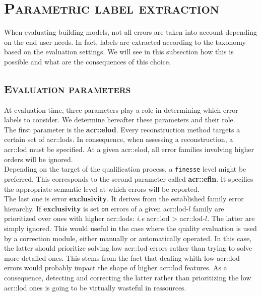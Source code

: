 \section{\textsc{Parametric label extraction}}
    \label{sec::semantic_evaluation::label_extraction}
    When evaluating building models, not all errors are taken into account depending on the end user needs.
    In fact, labels are extracted according to the taxonomy based on the evaluation settings.
    We will see in this subsection how this is possible and what are the consequences of this choice.

    \subsection{\textsc{Evaluation parameters}}
        At evaluation time, three parameters play a role in determining which error labels to consider.
        We determine hereafter these parameters and their role.\\

        The first parameter is the \textbf{\gls{acr::elod}}.
        Every reconstruction method targets a certain set of \glspl{acr::lod}.
        In consequence, when assessing a reconstruction, a \gls{acr::lod} must be specified.
        At a given \gls{acr::elod}, all error families involving higher orders will be ignored.\\
        Depending on the target of the qualification process, a \texttt{finesse} level might be preferred.
        This corresponds to the second parameter called \textbf{\gls{acr::efin}}.
        It specifies the appropriate semantic level at which errors will be reported.\\
        The last one is error \textbf{exclusivity}.
        It derives from the established family error hierarchy.
        If \textbf{exclusivity} is set \texttt{on} errors of a given \gls{acr::lod}-$l$ family are prioritized over ones with higher \glspl{acr::lod}: \textit{i.e} \gls{acr::lod} > \gls{acr::lod}-$l$.
        The latter are simply ignored.
        This would useful in the case where the quality evaluation is used by a correction module, either manually or automatically operated.
        In this case, the latter should prioritize solving low \gls{acr::lod} errors rather than trying to solve more detailed ones.
        This stems from the fact that dealing whith low \gls{acr::lod} errors would probably impact the shape of higher \gls{acr::lod} features.
        As a consequence, detecting and correcting the latter rather than prioritizing the low \gls{acr::lod} ones is going to be virtually wasteful in ressources.

